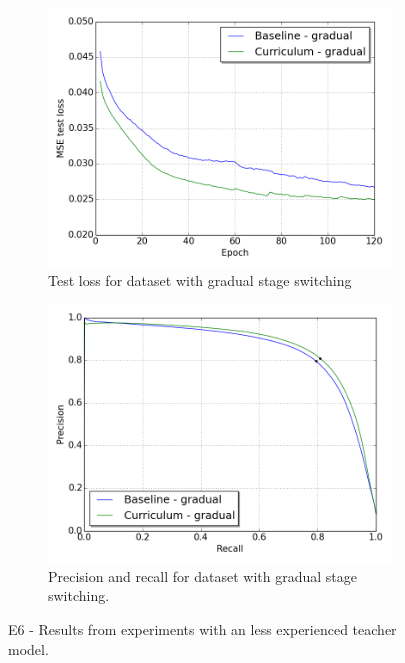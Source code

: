 \begin{figure}
\begin{subfigure}{0.5\textwidth}
\includegraphics[width=\linewidth]{figs/E6/E6_lc_gradual.png}
\caption{Test loss for dataset with gradual stage switching} \label{fig:E6_gradual_loss}
\end{subfigure}
\hspace*{\fill} %
\begin{subfigure}{0.5\textwidth}
\includegraphics[width=\linewidth]{figs/E6/E6_pr_gradual.png}
\caption{Precision and recall for dataset with gradual stage switching.} \label{fig:E6_gradual_pr}
\end{subfigure}
\hspace*{\fill} %
\caption[E6 - Results from experiments with an less experienced teacher ]{E6 - Results from experiments with an less experienced teacher model.} \label{fig:E6_curriculum_inexperienced}
\end{figure}

